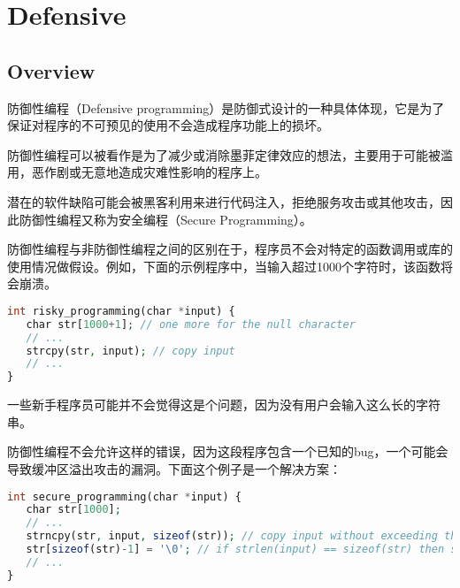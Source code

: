 \part{Defensive}


\chapter{Overview}


防御性编程（Defensive programming）是防御式设计的一种具体体现，它是为了保证对程序的不可预见的使用不会造成程序功能上的损坏。

防御性编程可以被看作是为了减少或消除墨菲定律效应的想法，主要用于可能被滥用，恶作剧或无意地造成灾难性影响的程序上。

潜在的软件缺陷可能会被黑客利用来进行代码注入，拒绝服务攻击或其他攻击，因此防御性编程又称为安全编程（Secure Programming）。

防御性编程与非防御性编程之间的区别在于，程序员不会对特定的函数调用或库的使用情况做假设。例如，下面的示例程序中，当输入超过1000个字符时，该函数将会崩溃。

\begin{lstlisting}[language=PHP]
int risky_programming(char *input) {
   char str[1000+1]; // one more for the null character
   // ...
   strcpy(str, input); // copy input
   // ...
}
\end{lstlisting}

一些新手程序员可能并不会觉得这是个问题，因为没有用户会输入这么长的字符串。

防御性编程不会允许这样的错误，因为这段程序包含一个已知的bug，一个可能会导致缓冲区溢出攻击的漏洞。下面这个例子是一个解决方案：

\begin{lstlisting}[language=PHP]
int secure_programming(char *input) {
   char str[1000];
   // ...
   strncpy(str, input, sizeof(str)); // copy input without exceeding the length of the destination
   str[sizeof(str)-1] = '\0'; // if strlen(input) == sizeof(str) then strcpy won't NUL terminate
   // ...
}
\end{lstlisting}